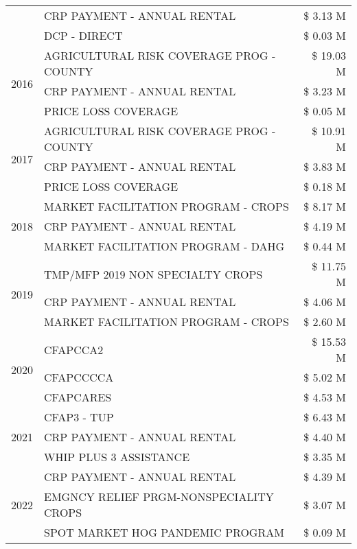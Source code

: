 \begin{tabular}{llr}
 & CRP PAYMENT - ANNUAL RENTAL & \$ 3.13 M \\
 & DCP - DIRECT & \$ 0.03 M \\
\cline{1-3}
\multirow[t]{3}{*}{2016} & AGRICULTURAL RISK COVERAGE PROG - COUNTY & \$ 19.03 M \\
 & CRP PAYMENT - ANNUAL RENTAL & \$ 3.23 M \\
 & PRICE LOSS COVERAGE & \$ 0.05 M \\
\cline{1-3}
\multirow[t]{3}{*}{2017} & AGRICULTURAL RISK COVERAGE PROG - COUNTY & \$ 10.91 M \\
 & CRP PAYMENT - ANNUAL RENTAL & \$ 3.83 M \\
 & PRICE LOSS COVERAGE & \$ 0.18 M \\
\cline{1-3}
\multirow[t]{3}{*}{2018} & MARKET FACILITATION PROGRAM - CROPS & \$ 8.17 M \\
 & CRP PAYMENT - ANNUAL RENTAL & \$ 4.19 M \\
 & MARKET FACILITATION PROGRAM - DAHG & \$ 0.44 M \\
\cline{1-3}
\multirow[t]{3}{*}{2019} & TMP/MFP 2019 NON SPECIALTY CROPS & \$ 11.75 M \\
 & CRP PAYMENT - ANNUAL RENTAL & \$ 4.06 M \\
 & MARKET FACILITATION PROGRAM - CROPS & \$ 2.60 M \\
\cline{1-3}
\multirow[t]{3}{*}{2020} & CFAPCCA2 & \$ 15.53 M \\
 & CFAPCCCCA & \$ 5.02 M \\
 & CFAPCARES & \$ 4.53 M \\
\cline{1-3}
\multirow[t]{3}{*}{2021} & CFAP3 - TUP & \$ 6.43 M \\
 & CRP PAYMENT - ANNUAL RENTAL & \$ 4.40 M \\
 & WHIP PLUS 3 ASSISTANCE & \$ 3.35 M \\
\cline{1-3}
\multirow[t]{3}{*}{2022} & CRP PAYMENT - ANNUAL RENTAL & \$ 4.39 M \\
 & EMGNCY RELIEF PRGM-NONSPECIALITY CROPS & \$ 3.07 M \\
 & SPOT MARKET HOG PANDEMIC PROGRAM & \$ 0.09 M \\
\cline{1-3}
\bottomrule
\end{tabular}

